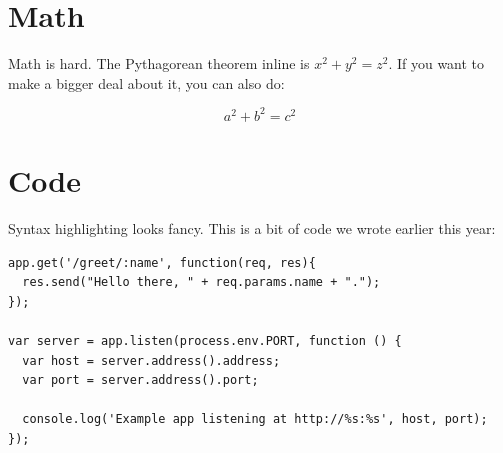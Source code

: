 \documentclass{article}
\begin{document}
\section{Math}

Math is hard. The Pythagorean theorem inline is \(x^2 + y^2 = z^2\). If you want to make a bigger deal about it, you can also do:

\[a^2 + b^2 = c^2\]

\section{Code}

Syntax highlighting looks fancy. This is a bit of code we wrote earlier this year:

\begin{verbatim}
app.get('/greet/:name', function(req, res){
  res.send("Hello there, " + req.params.name + ".");
});

var server = app.listen(process.env.PORT, function () {
  var host = server.address().address;
  var port = server.address().port;

  console.log('Example app listening at http://%s:%s', host, port);
});
\end{verbatim}
\end{document}

